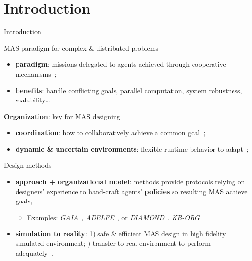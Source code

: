 \AtBeginSection[]{
    \begin{frame}
        \frametitle{}
        \tableofcontents[currentsection]
    \end{frame}
}


\section{Introduction}
\begin{frame}[allowframebreaks]{Introduction}

    \begin{block}{MAS paradigm for complex \& distributed problems}
        \begin{itemize}
            \item \textbf{paradigm}: missions delegated to agents achieved through cooperative mechanisms~\cite{Raileanu2023};
            \item \textbf{benefits}: handle conflicting goals, parallel computation, system robustness, scalability\dots
        \end{itemize}
    \end{block}

    \begin{block}{\textbf{Organization}: key for MAS designing}
        \begin{itemize}
            \item \textbf{coordination}: how to collaboratively achieve a common goal~\cite{Hubner2007};
            \item \textbf{dynamic \& uncertain environments}: flexible runtime behavior to adapt~\cite{Kathleen2020};
        \end{itemize}
    \end{block}

    \begin{block}{Design methods}
        \begin{itemize}
            \item \textbf{approach + organizational model}: methods provide protocols relying on designers' experience to hand-craft agents' \textbf{policies} so resulting MAS achieve goals;
            \begin{itemize}
                \item Examples: \emph{GAIA}~\cite{Wooldridge2000,Cernuzzi2014}, \emph{ADELFE}~\cite{Mefteh2015}, or \emph{DIAMOND}~\cite{Jamont2015}, \emph{KB-ORG}~\cite{Sims2008}
            \end{itemize}
          \item \textbf{simulation to reality}: 1) safe \& efficient MAS design in high fidelity simulated environment; ) transfer to real environment to perform adequately~\cite{Schon2021}.
        \end{itemize}


\end{block}
\end{frame}
